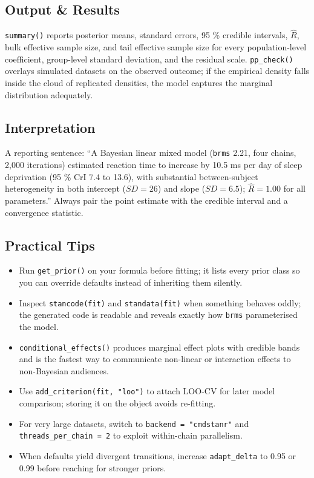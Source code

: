 \documentclass[
]{article}
\providecommand{\tightlist}{%
  \setlength{\itemsep}{0pt}\setlength{\parskip}{0pt}}
\begin{document}
\subsection{Output \& Results}\label{output-results}

\texttt{summary()} reports posterior means, standard errors, 95 \%
credible intervals, \(\hat R\), bulk effective sample size, and tail
effective sample size for every population-level coefficient,
group-level standard deviation, and the residual scale.
\texttt{pp\_check()} overlays simulated datasets on the observed
outcome; if the empirical density falls inside the cloud of replicated
densities, the model captures the marginal distribution adequately.

\subsection{Interpretation}\label{interpretation}

A reporting sentence: ``A Bayesian linear mixed model (\texttt{brms}
2.21, four chains, 2,000 iterations) estimated reaction time to increase
by 10.5 ms per day of sleep deprivation (95 \% CrI 7.4 to 13.6), with
substantial between-subject heterogeneity in both intercept
(\(SD = 26\)) and slope (\(SD = 6.5\)); \(\hat R = 1.00\) for all
parameters.'' Always pair the point estimate with the credible interval
and a convergence statistic.

\subsection{Practical Tips}\label{practical-tips}

\begin{itemize}
\tightlist
\item
  Run \texttt{get\_prior()} on your formula before fitting; it lists
  every prior class so you can override defaults instead of inheriting
  them silently.
\item
  Inspect \texttt{stancode(fit)} and \texttt{standata(fit)} when
  something behaves oddly; the generated code is readable and reveals
  exactly how \texttt{brms} parameterised the model.
\item
  \texttt{conditional\_effects()} produces marginal effect plots with
  credible bands and is the fastest way to communicate non-linear or
  interaction effects to non-Bayesian audiences.
\item
  Use \texttt{add\_criterion(fit,\ "loo")} to attach LOO-CV for later
  model comparison; storing it on the object avoids re-fitting.
\item
  For very large datasets, switch to \texttt{backend\ =\ "cmdstanr"} and
  \texttt{threads\_per\_chain\ =\ 2} to exploit within-chain
  parallelism.
\item
  When defaults yield divergent transitions, increase
  \texttt{adapt\_delta} to 0.95 or 0.99 before reaching for stronger
  priors.
\end{itemize}
\end{document}
